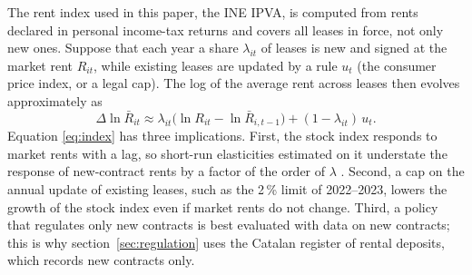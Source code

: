 The rent index used in this paper, the INE IPVA, is computed from rents declared in personal income-tax returns and covers all leases in force, not only new ones. Suppose that each year a share $\lambda_{it}$ of leases is new and signed at the market rent $R_{it}$, while existing leases are updated by a rule $u_t$ (the consumer price index, or a legal cap). The log of the average rent across leases then evolves approximately as
\begin{equation}\label{eq:index}
\Delta\ln\bar R_{it}\approx\lambda_{it}\big(\ln R_{it}-\ln\bar R_{i,t-1}\big)+(1-\lambda_{it})\,u_t .
\end{equation}
Equation \eqref{eq:index} has three implications. First, the stock index responds to market rents with a lag, so short-run elasticities estimated on it understate the response of new-contract rents by a factor of the order of $\lambda$ \citep{genesove2003,ambrose2015}. Second, a cap on the annual update of existing leases, such as the 2\,\% limit of 2022--2023, lowers the growth of the stock index even if market rents do not change. Third, a policy that regulates only new contracts is best evaluated with data on new contracts; this is why section~\ref{sec:regulation} uses the Catalan register of rental deposits, which records new contracts only.
